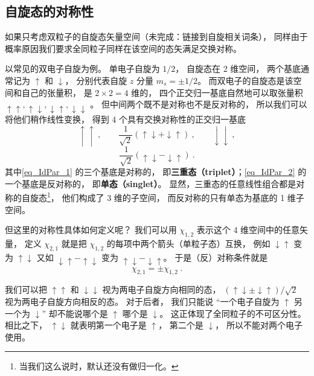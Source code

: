 \subsection{自旋态的对称性}
如果只考虑双粒子的自旋态矢量空间（未完成：链接到自旋相关词条）， 同样由于概率原因我们要求全同粒子同样在该空间的态矢满足交换对称。

\begin{example}{}\label{ex_IdPar_1}
以常见的双电子自旋为例。 单电子自旋为 $1/2$， 自旋态在 2 维空间， 两个基底通常记为 $\uparrow$ 和 $\downarrow$， 分别代表自旋 $z$ 分量 $m_s=\pm 1/2$。 而双电子的自旋态是该空间和自己的张量积， 是 $2\times2 = 4$ 维的， 四个正交归一基底自然地可以取张量积 $\uparrow\uparrow, \uparrow\downarrow, \downarrow\uparrow, \downarrow\downarrow$ 。 但中间两个既不是对称也不是反对称的， 所以我们可以将他们稍作线性变换， 得到 4 个具有交换对称性的正交归一基底
\begin{equation}\label{eq_IdPar_1}
\uparrow\uparrow ~,\qquad \frac{1}{\sqrt 2}(\uparrow\downarrow + \downarrow\uparrow)~,\qquad \downarrow\downarrow~,
\end{equation}
\begin{equation}\label{eq_IdPar_2}
\frac{1}{\sqrt 2}(\uparrow\downarrow - \downarrow\uparrow)~.
\end{equation}
其中\autoref{eq_IdPar_1} 的三个基底是对称的， 即\textbf{三重态（triplet）}；\autoref{eq_IdPar_2} 的一个基底是反对称的， 即\textbf{单态（singlet）}。 %
显然，三重态的任意线性组合都是对称的自旋态\footnote{当我们这么说时，默认还没有做归一化。}， 他们构成了 3 维的子空间， 而反对称的只有单态为基底的 1 维子空间。

但这里的对称性具体如何定义呢？ 我们可以用 $\chi_{1,2}$ 表示这个 4 维空间中的任意矢量， 定义 $\chi_{2,1}$ 就是把 $\chi_{1,2}$ 的每项中两个箭头（单粒子态）互换， 例如 $\downarrow\uparrow$ 变为 $\uparrow\downarrow$ 又如 $\downarrow\uparrow - \uparrow\downarrow$ 变为 $\uparrow\downarrow - \downarrow\uparrow$。 于是（反）对称条件就是
\begin{equation}\label{eq_IdPar_3}
\chi_{2,1} = \pm\chi_{1,2}~.
\end{equation}

我们可以把 $\uparrow\uparrow$ 和 $\downarrow\downarrow$ 视为两电子自旋方向相同的态， $(\uparrow\downarrow \pm \downarrow\uparrow)/\sqrt{2}$ 视为两电子自旋方向相反的态。 对于后者， 我们只能说 “一个电子自旋为 $\uparrow$ 另一个为 $\downarrow$” 却不能说哪个是 $\uparrow$ 哪个是 $\downarrow$。 这正体现了全同粒子的不可区分性。 相比之下， $\uparrow\downarrow$ 就表明第一个电子是 $\uparrow$， 第二个是 $\downarrow$， 所以不能对两个电子使用。
\end{example}

